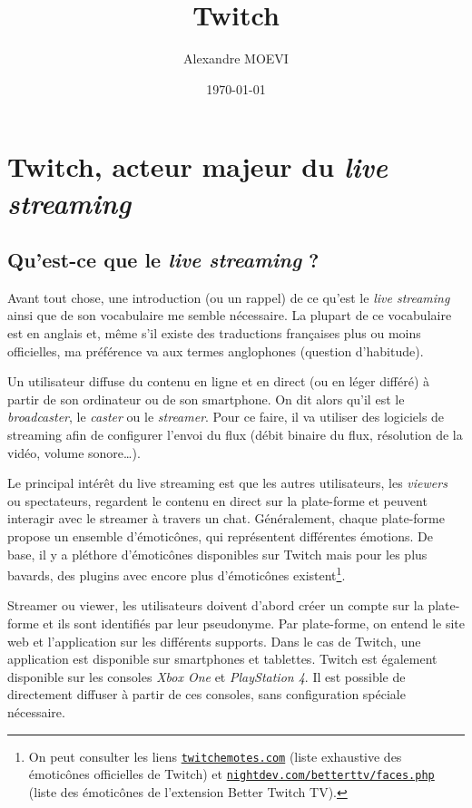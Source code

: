 \documentclass[a4paper]{article}
\title{Twitch}
\author{Alexandre MOEVI}
\date{\today}
\begin{document}
\maketitle

\section{Twitch, acteur majeur du \textit{live streaming}}
\subsection{Qu'est-ce que le \textit{live streaming} ?}
Avant tout chose, une introduction (ou un rappel) de ce qu'est le \textit{live streaming} ainsi que de son vocabulaire me semble nécessaire. La plupart de ce vocabulaire est en anglais et, même s'il existe des traductions françaises plus ou moins officielles, ma préférence va aux termes anglophones (question d'habitude).

Un utilisateur diffuse du contenu en ligne et en direct (ou en léger différé) à partir de son ordinateur ou de son smartphone. On dit alors qu'il est le \textit{broadcaster}, le \textit{caster} ou le \textit{streamer}. Pour ce faire, il va utiliser des logiciels de streaming afin de configurer l'envoi du flux (débit binaire du flux, résolution de la vidéo, volume sonore\ldots).

Le principal intérêt du live streaming est que les autres utilisateurs, les \textit{viewers} ou spectateurs, regardent le contenu en direct sur la plate-forme et peuvent interagir avec le streamer à travers un chat. Généralement, chaque plate-forme propose un ensemble d'émoticônes, qui représentent différentes émotions. De base, il y a pléthore d'émoticônes disponibles sur Twitch mais pour les plus bavards, des plugins avec encore plus d'émoticônes existent\footnote{On peut consulter les liens \href{https://twitchemotes.com/}{\texttt{twitchemotes.com}} (liste exhaustive des émoticônes officielles de Twitch) et \href{https://nightdev.com/betterttv/faces.php}{\texttt{nightdev.com/betterttv/faces.php}} (liste des émoticônes de l'extension Better Twitch TV).}.

Streamer ou viewer, les utilisateurs doivent d'abord créer un compte sur la plate-forme et ils sont identifiés par leur pseudonyme. Par plate-forme, on entend le site web et l'application sur les différents supports. Dans le cas de Twitch, une application est disponible sur smartphones et tablettes. Twitch est également disponible sur les consoles \textit{Xbox One} et \textit{PlayStation 4}. Il est possible de directement diffuser à partir de ces consoles, sans configuration spéciale nécessaire.
\end{document}
